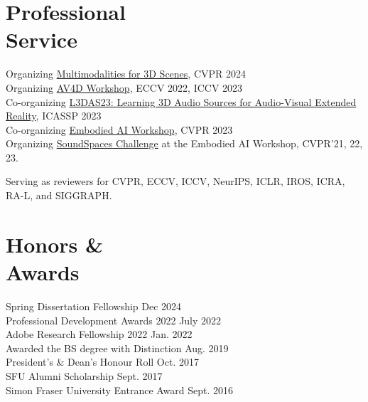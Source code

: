 \documentclass[margin, 10pt]{res} %
\begin{document}
\begin{resume}
\section{Professional \\ Service}
Organizing \href{https://multimodalitiesfor3dscenes.github.io/}{Multimodalities for 3D Scenes}, CVPR 2024 \\
Organizing \href{https://av4d.org}{AV4D Workshop}, ECCV 2022, ICCV 2023 \\
Co-organizing \href{https://www.l3das.com/icassp2023/}{L3DAS23: Learning 3D Audio Sources for Audio-Visual Extended Reality}, ICASSP 2023 \\
Co-organizing \href{https://embodied-ai.org/}{Embodied AI Workshop}, CVPR 2023\\
Organizing \href{https://soundspaces.org/challenge}{SoundSpaces Challenge} at the Embodied AI Workshop, CVPR'21, 22, 23.

Serving as reviewers for CVPR, ECCV, ICCV, NeurIPS, ICLR, IROS, ICRA, RA-L, and SIGGRAPH.


\section{Honors \& \\ Awards}
Spring Dissertation Fellowship \hfill Dec 2024\\
Professional Development Awards 2022 \hfill July 2022 \\
Adobe Research Fellowship 2022 \hfill Jan. 2022 \\
Awarded the BS degree with Distinction \hfill Aug. 2019 \\ 
President's \& Dean's Honour Roll \hfill Oct. 2017 \\
SFU Alumni Scholarship \hfill Sept. 2017 \\
Simon Fraser University Entrance Award \hfill Sept. 2016


\end{resume}
\end{document}
